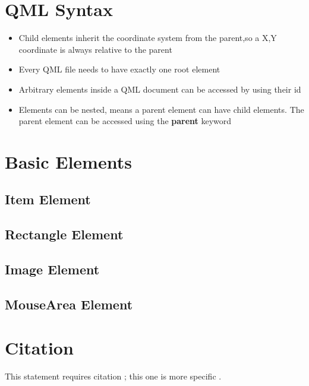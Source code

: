 \section{QML Syntax}

\begin{itemize}
	\item  Child elements inherit the coordinate system from the parent,so a X,Y coordinate is always relative to the parent
	\item Every QML file needs to have exactly one root element
	\item Arbitrary elements inside a QML document can be accessed by using their id
	\item Elements can be nested, means a parent element can have child elements. The parent element can be
	accessed using the {\textbf{parent}} keyword
\end{itemize}



\section{Basic Elements}

\subsection{Item Element}
\subsection{Rectangle Element}
\subsection{Image Element}
\subsection{MouseArea Element}












\section{Citation}

This statement requires citation \cite{book_key}; this one is more specific \cite[122]{article_key}.



